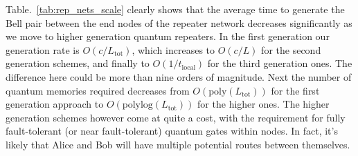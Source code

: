 Table.~\ref{tab:rep_nets_scale} clearly shows that the average time to generate the Bell pair between the end nodes of the repeater network decreases significantly as we move to higher generation quantum repeaters. In the first generation our generation rate is $O(c/L_\mathrm{tot})$, which increases to $O(c/L)$ for the second generation schemes, and finally to $O(1/t_\mathrm{local})$ for the third generation ones. The difference here could be more than nine orders of magnitude. Next the number of quantum memories required decreases from $O(\mathrm{poly}(L_\mathrm{tot}))$ for the first generation approach to $O(\mathrm{polylog}(L_\mathrm{tot}))$ for the higher ones. The higher generation schemes however come at quite a cost, with the requirement for fully fault-tolerant (or near fault-tolerant) quantum gates within nodes. In fact, it's likely that Alice and Bob will have multiple potential routes between themselves.





